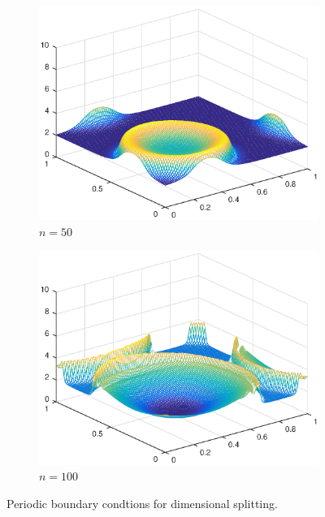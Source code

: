 \begin{figure}[h!]
\begin{subfigure}[t]{0.48\textwidth}
        \includegraphics[width=\textwidth]{images/sol_ds_0050.eps}
        \caption{$n=50$}
        \label{fig:50}
    \end{subfigure}
    \begin{subfigure}[t]{0.48\textwidth}
        \centering
        \includegraphics[width=\textwidth]{images/sol_ds_0100.eps}
        \caption{$n=100$}
        \label{fig:100}
    \end{subfigure}
    \caption{Periodic boundary condtions for dimensional splitting.}
    \label{fig:2DSolutions_ds}
\end{figure}

